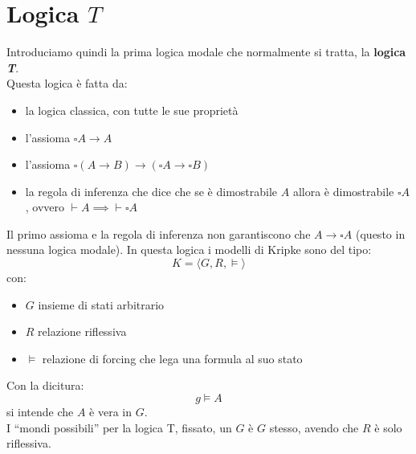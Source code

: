 \documentclass[a4paper,12pt, oneside]{book}
\begin{document}
\section{Logica $T$}
Introduciamo quindi la prima logica modale che normalmente si tratta, la
\textbf{logica \textit{T}}.\\
Questa logica è fatta da:
\begin{itemize}
  \item la logica classica, con tutte le sue proprietà
  \item l'assioma $\square A\to A$
  \item l'assioma $\square(A\to B)\to(\square A\to\square B)$
  \item la regola di inferenza che dice che se è dimostrabile $A$ allora è
  dimostrabile $\square A$, ovvero $\vdash A\implies \vdash \square A$
\end{itemize}
Il primo assioma e la regola di inferenza non garantiscono che $A\to\square A$
(questo in nessuna logica modale).
In questa logica i modelli di Kripke sono del tipo:
\[K=\langle G, R, \vDash\rangle\]
con:
\begin{itemize}
  \item $G$ insieme di stati arbitrario
  \item $R$ relazione riflessiva
  \item $\vDash$ relazione di forcing che lega una formula al suo stato
\end{itemize}
Con la dicitura:
\[g\vDash A\]
si intende che $A$ è vera in $G$. \\
I ``mondi possibili'' per la logica T, fissato, un $G$ è $G$ stesso, avendo che
$R$ è solo riflessiva. 
\end{document}

